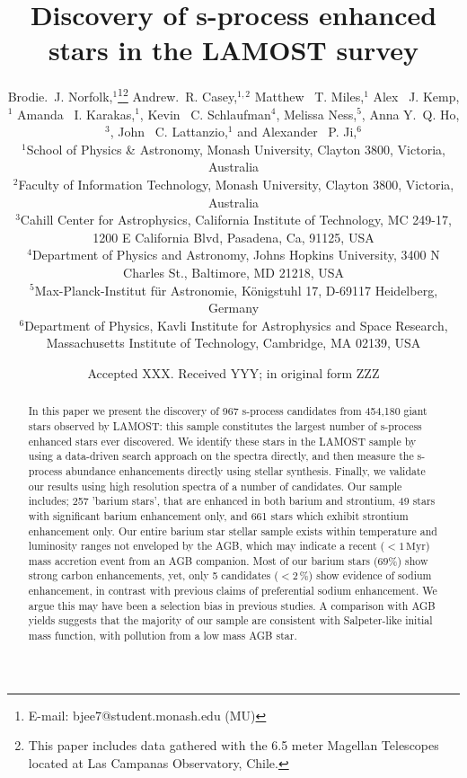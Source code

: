 \documentclass[a4paper,fleqn,usenatbib]{mnras}
\title[S-process stars in LAMOST]{Discovery of s-process enhanced stars in the LAMOST survey}
\author[Brodie.~J. Norfolk et al.]{Brodie.~J. Norfolk,$^{1}$\thanks{E-mail: bjee7@student.monash.edu (MU)}\thanks{This paper includes data gathered with the 6.5 meter Magellan Telescopes located at Las Campanas Observatory, Chile.}
Andrew.~R. Casey,$^{1,2}$
Matthew ~T. Miles,$^{1}$
Alex ~J. Kemp,$^{1}$ \newauthor
Amanda ~I. Karakas,$^{1}$,
Kevin ~C. Schlaufman$^{4}$,
Melissa Ness,$^{5}$,
Anna Y.~Q. Ho,$^{3}$, \newauthor
John ~C. Lattanzio,$^{1}$ and
Alexander ~P. Ji,$^{6}$
\\
$^{1}$School of Physics \& Astronomy, Monash University, Clayton 3800, Victoria, Australia\\
$^{2}$Faculty of Information Technology, Monash University, Clayton 3800, Victoria, Australia\\
$^{3}$Cahill Center for Astrophysics, California Institute of Technology, MC 249-17, 1200 E California Blvd, Pasadena, Ca, 91125, USA\\
$^{4}$Department of Physics and Astronomy, Johns Hopkins University, 3400 N Charles St., Baltimore, MD 21218, USA
\\
$^{5}$Max-Planck-Institut f\"ur Astronomie, K\"onigstuhl 17, D-69117 Heidelberg, Germany
\\
$^{6}$Department of Physics, Kavli Institute for Astrophysics and Space Research, Massachusetts Institute of Technology,
Cambridge, MA 02139, USA
}
\date{Accepted XXX. Received YYY; in original form ZZZ}
\begin{document}
\label{firstpage}
\pagerange{\pageref{firstpage}--\pageref{lastpage}}
\maketitle

\begin{abstract}

In this paper we present the discovery of 967 s-process candidates from 454,180 giant stars observed by LAMOST: this sample constitutes the largest number of s-process enhanced stars ever discovered. We identify these stars in the LAMOST sample by using a data-driven search approach on the spectra directly, and then measure the s-process abundance enhancements directly using stellar synthesis. Finally, we validate our results using high resolution spectra of a number of candidates. Our sample includes; 257 'barium stars', that are enhanced in both barium and strontium, 49 stars with significant barium enhancement only, and 661 stars which exhibit strontium enhancement only. Our entire barium star stellar sample exists within temperature and luminosity ranges not enveloped by the AGB, which may indicate a recent ($<1\,\textrm{Myr}$) mass accretion event from an AGB companion. Most of our barium stars ($69\%$) show strong carbon enhancements, yet, only 5 candidates ($<2$\,\%) show evidence of sodium enhancement, in contrast with previous claims of preferential sodium enhancement. We argue this may have been a selection bias in previous studies. A comparison with AGB yields suggests that the majority of our sample are consistent with Salpeter-like initial mass function, with pollution from a low mass AGB star.


\end{abstract}
\end{document}
